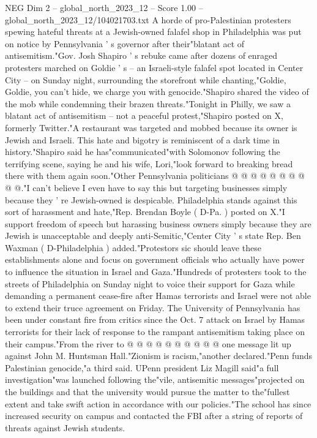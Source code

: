 \begin{textsample}{NEG Dim 2 – global\_north\_2023\_12 – Score 1.00 – global\_north\_2023\_12/104021703.txt}  \label{ex:f2_neg_337}
A horde of pro-Palestinian protesters spewing hateful threats at a Jewish-owned falafel shop in Philadelphia was put on notice by Pennsylvania ' s governor after their"blatant act of antisemitism."Gov.
Josh Shapiro ' s rebuke came after dozens of enraged protesters marched on Goldie ' s -- an Israeli-style falafel spot located in Center City -- on Sunday night, surrounding the storefront while chanting,"Goldie, Goldie, you can't hide, we charge you with genocide."Shapiro shared the video of the mob while condemning their brazen threats."Tonight in Philly, we saw a blatant act of antisemitism -- not a peaceful protest,"Shapiro posted on X, formerly Twitter."A restaurant was targeted and mobbed because its owner is Jewish and Israeli.
This hate and bigotry is reminiscent of a dark time in history."Shapiro said he has"communicated"with Solomonov following the terrifying scene, saying he and his wife, Lori,"look forward to breaking bread there with them again soon."Other Pennsylvania politicians @ @ @ @ @ @ @ @ @ @."I can't believe I even have to say this but targeting businesses simply because they ' re Jewish-owned is despicable.
Philadelphia stands against this sort of harassment and hate,"Rep.
Brendan Boyle ( D-Pa. ) posted on X."I support freedom of speech but harassing business owners simply because they are Jewish is unacceptable and deeply anti-Semitic,"Center City ' s state Rep.
Ben Waxman ( D-Philadelphia ) added."Protestors sic should leave these establishments alone and focus on government officials who actually have power to influence the situation in Israel and Gaza."Hundreds of protesters took to the streets of Philadelphia on Sunday night to voice their support for Gaza while demanding a permanent cease-fire after Hamas terrorists and Israel were not able to extend their truce agreement on Friday.
The University of Pennsylvania has been under constant fire from critics since the Oct. 7 attack on Israel by Hamas terrorists for their lack of response to the rampant antisemitism taking place on their campus."From the river to @ @ @ @ @ @ @ @ @ @ one message lit up against John M.
Huntsman Hall."Zionism is racism,"another declared."Penn funds Palestinian genocide,"a third said.
UPenn president Liz Magill said"a full investigation"was launched following the"vile, antisemitic messages"projected on the buildings and that the university would pursue the matter to the"fullest extent and take swift action in accordance with our policies."The school has since increased security on campus and contacted the FBI after a string of reports of threats against Jewish students.

\end{textsample}

